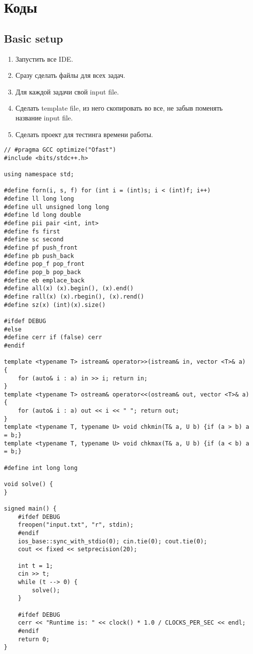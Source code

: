 \documentclass[14pt,fleqn]{article}
\begin{document}
\pagebreak
\section{Коды}

\subsection{Basic setup}
\begin{enumerate}[topsep=0pt,itemsep=-1ex,partopsep=1ex,parsep=1ex]
	\item Запустить все IDE.
	\item Сразу сделать файлы для всех задач.
	\item Для каждой задачи свой input file.
	\item Сделать template file, из него скопировать во все, не забыв поменять название input file.
	\item Сделать проект для тестинга времени работы.
\end{enumerate}
\begin{Verbatim}[tabsize=4]
// #pragma GCC optimize("Ofast")
#include <bits/stdc++.h>

using namespace std;

#define forn(i, s, f) for (int i = (int)s; i < (int)f; i++)
#define ll long long
#define ull unsigned long long
#define ld long double
#define pii pair <int, int>
#define fs first
#define sc second
#define pf push_front
#define pb push_back
#define pop_f pop_front
#define pop_b pop_back
#define eb emplace_back
#define all(x) (x).begin(), (x).end()
#define rall(x) (x).rbegin(), (x).rend()
#define sz(x) (int)(x).size()

#ifdef DEBUG
#else
#define cerr if (false) cerr
#endif

template <typename T> istream& operator>>(istream& in, vector <T>& a) {
	for (auto& i : a) in >> i; return in;
}
template <typename T> ostream& operator<<(ostream& out, vector <T>& a) {
	for (auto& i : a) out << i << " "; return out;
}
template <typename T, typename U> void chkmin(T& a, U b) {if (a > b) a = b;}
template <typename T, typename U> void chkmax(T& a, U b) {if (a < b) a = b;}

#define int long long

void solve() {
}

signed main() {
	#ifdef DEBUG
	freopen("input.txt", "r", stdin);
	#endif
	ios_base::sync_with_stdio(0); cin.tie(0); cout.tie(0);
	cout << fixed << setprecision(20);
	
	int t = 1;
	cin >> t;
	while (t --> 0) {
		solve();
	}
	
	#ifdef DEBUG
	cerr << "Runtime is: " << clock() * 1.0 / CLOCKS_PER_SEC << endl;
	#endif
	return 0;
}
\end{Verbatim}
\end{document}
